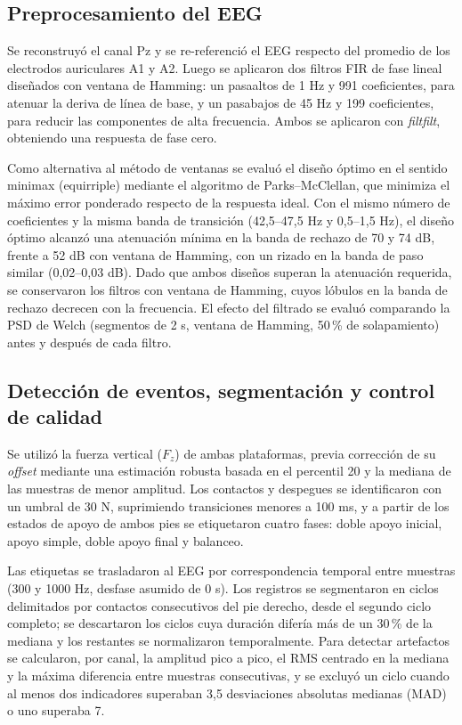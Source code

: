 \documentclass[10pt]{article}
\begin{document}
\subsection{Preprocesamiento del EEG}

Se reconstruyó el canal Pz y se re-referenció el EEG respecto del promedio de los electrodos auriculares A1 y A2. Luego se aplicaron dos filtros FIR de fase lineal diseñados con ventana de Hamming: un pasaaltos de 1 Hz y 991 coeficientes, para atenuar la deriva de línea de base, y un pasabajos de 45 Hz y 199 coeficientes, para reducir las componentes de alta frecuencia. Ambos se aplicaron con \textit{filtfilt}, obteniendo una respuesta de fase cero.

Como alternativa al método de ventanas se evaluó el diseño óptimo en el sentido minimax (equirriple) mediante el algoritmo de Parks--McClellan, que minimiza el máximo error ponderado respecto de la respuesta ideal. Con el mismo número de coeficientes y la misma banda de transición (42,5--47,5 Hz y 0,5--1,5 Hz), el diseño óptimo alcanzó una atenuación mínima en la banda de rechazo de 70 y 74 dB, frente a 52 dB con ventana de Hamming, con un rizado en la banda de paso similar (0,02--0,03 dB). Dado que ambos diseños superan la atenuación requerida, se conservaron los filtros con ventana de Hamming, cuyos lóbulos en la banda de rechazo decrecen con la frecuencia. El efecto del filtrado se evaluó comparando la PSD de Welch (segmentos de 2 s, ventana de Hamming, 50\,\% de solapamiento) antes y después de cada filtro.

\subsection{Detección de eventos, segmentación y control de calidad}

Se utilizó la fuerza vertical ($F_z$) de ambas plataformas, previa corrección de su \textit{offset} mediante una estimación robusta basada en el percentil 20 y la mediana de las muestras de menor amplitud. Los contactos y despegues se identificaron con un umbral de 30 N, suprimiendo transiciones menores a 100 ms, y a partir de los estados de apoyo de ambos pies se etiquetaron cuatro fases: doble apoyo inicial, apoyo simple, doble apoyo final y balanceo.

Las etiquetas se trasladaron al EEG por correspondencia temporal entre muestras (300 y 1000 Hz, desfase asumido de 0 s). Los registros se segmentaron en ciclos delimitados por contactos consecutivos del pie derecho, desde el segundo ciclo completo; se descartaron los ciclos cuya duración difería más de un 30\,\% de la mediana y los restantes se normalizaron temporalmente. Para detectar artefactos se calcularon, por canal, la amplitud pico a pico, el RMS centrado en la mediana y la máxima diferencia entre muestras consecutivas, y se excluyó un ciclo cuando al menos dos indicadores superaban 3,5 desviaciones absolutas medianas (MAD) o uno superaba 7.
\end{document}
